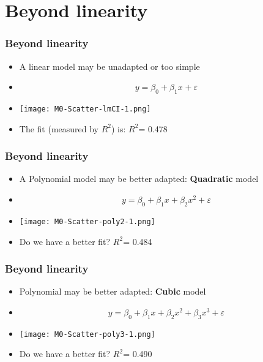 \documentclass[xcolor=x11names,compress, aspectratio=169]{beamer}
\renewcommand{\(}{\begin{columns}}
\renewcommand{\)}{\end{columns}}
\newcommand{\<}[1]{\begin{column}{#1}}
\renewcommand{\>}{\end{column}}
\begin{document}
\section{Beyond linearity}

\begin{frame} %
\frametitle{Beyond linearity}
\pause
\begin{itemize}
 \item A linear model may be unadapted or too simple
 \item[]  $$y = \beta_0 + \beta_1 x^{} + \varepsilon$$
 \item[] \texttt{[image: M0-Scatter-lmCI-1.png]}
 \item[] The fit (measured by $R^2$) is: $R^2$= 0.478
 \end{itemize}
\end{frame}


\begin{frame} %
\frametitle{Beyond linearity}

\begin{itemize}
 \item A Polynomial model may be better adapted: \textbf{Quadratic} model
 \item[]  $$y = \beta_0 + \beta_1 x +  \beta_2 x^2+ \varepsilon$$
 \item[] \texttt{[image: M0-Scatter-poly2-1.png]}
 \item[] Do we have a better fit? $R^2$= 0.484
 \end{itemize}
\end{frame}

\begin{frame} %
\frametitle{Beyond linearity}

\begin{itemize}
 \item Polynomial may be better adapted: \textbf{Cubic} model
 \item[]  $$y = \beta_0 + \beta_1 x +  \beta_2 x^2 + \beta_3 x^3+ \varepsilon$$
 \item[] \texttt{[image: M0-Scatter-poly3-1.png]}
 \item[] Do we have a better fit? $R^2$= 0.490
 \end{itemize}
\end{frame}
\end{document}
